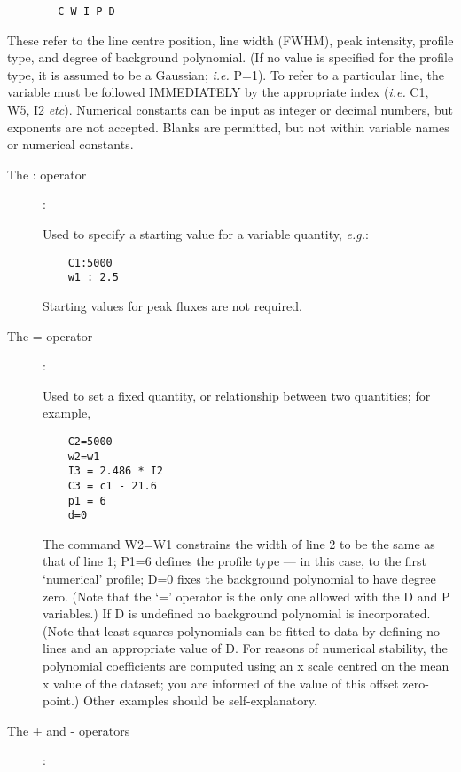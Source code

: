 \begin {description}
\begin{verbatim}
        C W I P D
\end{verbatim}

These refer to the line centre position, line width (FWHM), peak
intensity, profile type, and degree of background polynomial. (If no
value is specified for the profile type, it is assumed to be a
Gaussian; {\em i.e.} P=1). To refer to a particular line, the variable
must be followed IMMEDIATELY by the appropriate index ({\em i.e.} C1,
W5, I2 {\em etc}). Numerical constants can be input as integer or decimal
numbers, but exponents are not accepted. Blanks are permitted, but not
within variable names or numerical constants.

\begin{description}

\item [The : operator]:

Used to specify a starting value for a variable quantity, {\em e.g.}:

\begin{verbatim}
    C1:5000
    w1 : 2.5
\end{verbatim}

Starting values for peak fluxes are not required.

\item [The = operator]:

Used to set a fixed quantity, or relationship between two quantities; for
example,

\begin{verbatim}
    C2=5000
    w2=w1
    I3 = 2.486 * I2
    C3 = c1 - 21.6
    p1 = 6
    d=0
\end{verbatim}

The command W2=W1 constrains the width of line 2 to be the same as
that of line 1; P1=6 defines the profile type --- in this case, to the
first `numerical' profile; D=0 fixes the background polynomial to have
degree zero. (Note that the `=' operator is the only one allowed with
the D and P variables.) If D is undefined no background polynomial is
incorporated. (Note that least-squares polynomials can be fitted to
data by defining no lines and an appropriate value of D. For reasons
of numerical stability, the polynomial coefficients are computed using
an x scale centred on the mean x value of the dataset; you are
informed of the value of this offset zero-point.) Other examples
should be self-explanatory.

\item [The + and - operators]:


\end{description}
\end{description}
